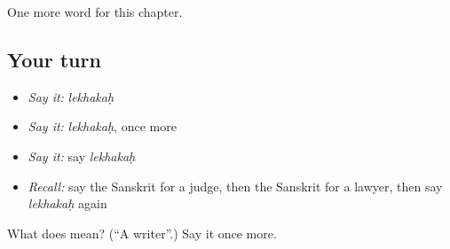 \begin{grammarlens}[title={What you've built}]
One more word for this chapter.
\end{grammarlens}

\subsection*{Your turn}
\begin{itemize}
\raggedright
  \item \emph{Say it:} \emph{lekhakaḥ}
  \item \emph{Say it:} \emph{lekhakaḥ}, once more
  \item \emph{Say it:} say \emph{lekhakaḥ}
  \item \emph{Recall:} say the Sanskrit for a judge, then the Sanskrit for a lawyer, then say \emph{lekhakaḥ} again
\end{itemize}

\begin{tcolorbox}[breakable,colback=teal!4,colframe=teal!35!black,title={Before you move on}]
What does  mean? (\textquotedblleft{}A writer\textquotedblright{}.) Say it once more.
\end{tcolorbox}
